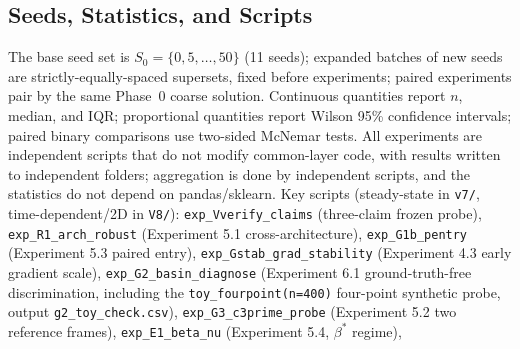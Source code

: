 \documentclass[11pt]{article}
\numberwithin{equation}{section}
\begin{document}
\subsection{Seeds, Statistics, and Scripts}
The base seed set is $S_0=\{0,5,\dots,50\}$ (11 seeds); expanded batches of new seeds are strictly-equally-spaced supersets, fixed before experiments; paired experiments pair by the same Phase~0 coarse solution. Continuous quantities report $n$, median, and IQR; proportional quantities report Wilson 95\% confidence intervals; paired binary comparisons use two-sided McNemar tests. All experiments are independent scripts that do not modify common-layer code, with results written to independent folders; aggregation is done by independent scripts, and the statistics do not depend on pandas/sklearn. Key scripts (steady-state in \texttt{v7/\hspace{0pt}}, time-dependent/2D in \texttt{V8/\hspace{0pt}}): \texttt{exp\_\hspace{0pt}Vverify\_\hspace{0pt}claims} (three-claim frozen probe), \texttt{exp\_\hspace{0pt}R1\_\hspace{0pt}arch\_\hspace{0pt}robust} (Experiment 5.1 cross-architecture), \texttt{exp\_\hspace{0pt}G1b\_\hspace{0pt}pentry} (Experiment 5.3 paired entry), \texttt{exp\_\hspace{0pt}Gstab\_\hspace{0pt}grad\_\hspace{0pt}stability} (Experiment 4.3 early gradient scale), \texttt{exp\_\hspace{0pt}G2\_\hspace{0pt}basin\_\hspace{0pt}diagnose} (Experiment 6.1 ground-truth-free discrimination, including the \texttt{toy\_\hspace{0pt}fourpoint(n=400)} four-point synthetic probe, output \texttt{g2\_\hspace{0pt}toy\_\hspace{0pt}check.csv}), \texttt{exp\_\hspace{0pt}G3\_\hspace{0pt}c3prime\_\hspace{0pt}probe} (Experiment 5.2 two reference frames), \texttt{exp\_\hspace{0pt}E1\_\hspace{0pt}beta\_\hspace{0pt}nu} (Experiment 5.4, $\beta^*$ regime), 
\end{document}
